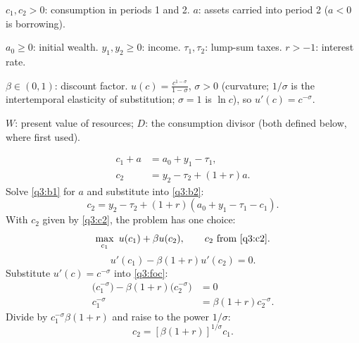 \begin{sol}
\begin{notacao}
\item $c_1,c_2>0$: consumption in periods 1 and 2. $a$: assets carried into period 2 ($a<0$ is borrowing).
\item $a_0\ge0$: initial wealth. $y_1,y_2\ge0$: income. $\tau_1,\tau_2$: lump-sum taxes. $r>-1$: interest rate.
\item $\beta\in(0,1)$: discount factor. $u(c)=\frac{c^{1-\sigma}}{1-\sigma}$, $\sigma>0$ (curvature; $1/\sigma$ is the intertemporal
elasticity of substitution; $\sigma=1$ is $\ln c$), so $u'(c)=c^{-\sigma}$.
\item $W$: present value of resources; $D$: the consumption divisor (both defined below, where first used).
\end{notacao}
\begin{align}
c_1+a &= a_0+y_1-\tau_1, \label{q3:b1}\\
c_2 &= y_2-\tau_2+(1+r)a. \label{q3:b2}
\end{align}
Solve \eqref{q3:b1} for $a$ and substitute into \eqref{q3:b2}:
\begin{equation}
c_2=y_2-\tau_2+(1+r)(a_0+y_1-\tau_1-c_1). \label{q3:c2}
\end{equation}
With $c_2$ given by \eqref{q3:c2}, the problem has one choice:
\begin{equation}
\max_{c_1}\ u(c_1)+\beta u(c_2),\qquad c_2\ \text{from \eqref{q3:c2}}. \label{q3:max}
\end{equation}
\begin{equation}
u'(c_1)-\beta(1+r)u'(c_2)=0. \label{q3:foc}
\end{equation}
Substitute $u'(c)=c^{-\sigma}$ into \eqref{q3:foc}:
\begin{align*}
\big(c_1^{-\sigma}\big)-\beta(1+r)\big(c_2^{-\sigma}\big) &= 0\\
c_1^{-\sigma} &= \beta(1+r)c_2^{-\sigma}.
\end{align*}
Divide by $c_1^{-\sigma}\beta(1+r)$ and raise to the power $1/\sigma$:
\begin{equation}
c_2=[\beta(1+r)]^{1/\sigma}c_1. \label{q3:euler}
\end{equation}
\begin{equation}

\end{equation}
\end{sol}
